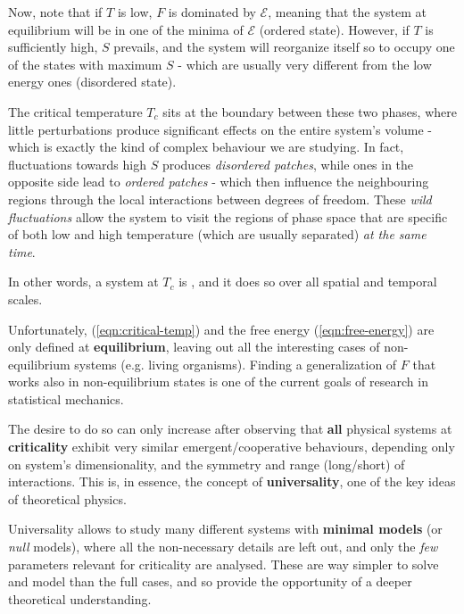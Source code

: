 \documentclass[../template.tex]{subfiles}
\begin{document}
\begin{itemize}
    \medskip 

    Now, note that if $T$ is low, $F$ is dominated by $\mathcal{E}$, meaning that the system at equilibrium will be in one of the minima of $\mathcal{E}$ (ordered state). However, if $T$ is sufficiently high, $S$ prevails, and the system will reorganize itself so to occupy one of the states with maximum $S$ - which are usually very different from the low energy ones (disordered state).
    
    The critical temperature $T_c$ sits at the boundary between these two phases, where little perturbations produce significant effects on the entire system's volume - which is exactly the kind of complex behaviour we are studying. In fact, fluctuations towards high $S$ produces \textit{disordered patches}, while ones in the opposite side lead to \textit{ordered patches} - which then influence the neighbouring regions through the local interactions between degrees of freedom. These \textit{wild fluctuations} allow the system to visit the regions of phase space that are specific of both low and high temperature (which are usually separated) \textit{at the same time}.

    \medskip

    In other words, a system at $T_c$ is , and it does so over all spatial and temporal scales.
\end{itemize}

Unfortunately, (\ref{eqn:critical-temp}) and the free energy (\ref{eqn:free-energy}) are only defined at \textbf{equilibrium}, leaving out all the interesting cases of non-equilibrium systems (e.g. living organisms). Finding a generalization of $F$ that works also in non-equilibrium states is one of the current goals of research in statistical mechanics. 

\medskip

The desire to do so can only increase after observing that \textbf{all} physical systems at \textbf{criticality} exhibit very similar emergent/cooperative behaviours, depending only on system's dimensionality, and the symmetry and range (long/short) of interactions. This is, in essence, the concept of \textbf{universality}, one of the key ideas of theoretical physics. 

\medskip

Universality allows to study many different systems with \textbf{minimal models} (or \textit{null} models), where all the non-necessary details are left out, and only the \textit{few} parameters relevant for criticality are analysed. These are way simpler to solve and model than the full cases, and so provide the opportunity of a deeper theoretical understanding.
\end{document}

